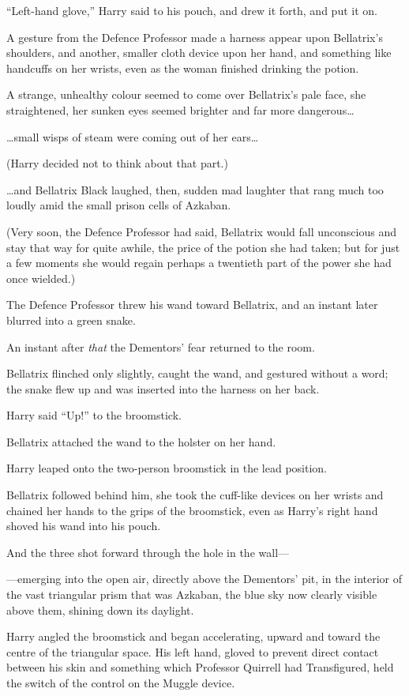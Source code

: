 “Left-hand glove,” Harry said to his pouch, and drew it forth, and put it on.

A gesture from the Defence Professor made a harness appear upon Bellatrix’s shoulders, and another, smaller cloth device upon her hand, and something like handcuffs on her wrists, even as the woman finished drinking the potion.

A strange, unhealthy colour seemed to come over Bellatrix’s pale face, she straightened, her sunken eyes seemed brighter and far more dangerous…

…small wisps of steam were coming out of her ears…

(Harry decided not to think about that part.)

…and Bellatrix Black laughed, then, sudden mad laughter that rang much too loudly amid the small prison cells of Azkaban.

(Very soon, the Defence Professor had said, Bellatrix would fall unconscious and stay that way for quite awhile, the price of the potion she had taken; but for just a few moments she would regain perhaps a twentieth part of the power she had once wielded.)

The Defence Professor threw his wand toward Bellatrix, and an instant later blurred into a green snake.

An instant after \emph{that} the Dementors’ fear returned to the room.

Bellatrix flinched only slightly, caught the wand, and gestured without a word; the snake flew up and was inserted into the harness on her back.

Harry said “Up!” to the broomstick.

Bellatrix attached the wand to the holster on her hand.

Harry leaped onto the two-person broomstick in the lead position.

Bellatrix followed behind him, she took the cuff-like devices on her wrists and chained her hands to the grips of the broomstick, even as Harry’s right hand shoved his wand into his pouch.

And the three shot forward through the hole in the wall—

—emerging into the open air, directly above the Dementors’ pit, in the interior of the vast triangular prism that was Azkaban, the blue sky now clearly visible above them, shining down its daylight.

Harry angled the broomstick and began accelerating, upward and toward the centre of the triangular space. His left hand, gloved to prevent direct contact between his skin and something which Professor Quirrell had Transfigured, held the switch of the control on the Muggle device.


